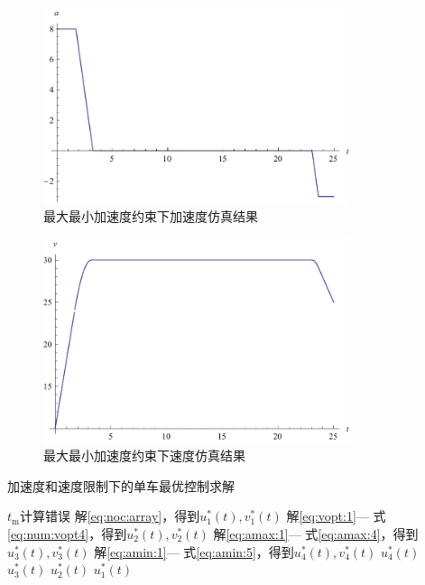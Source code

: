 \begin{figure}[htbp]
\centering
\includegraphics[width=9cm]{figures/uopt/ma.pdf}
\caption{最大最小加速度约束下加速度仿真结果}
\label{fig:amin:ma}
\end{figure}
\begin{figure}[htbp]
\centering
\includegraphics[width=9cm]{figures/uopt/mv.pdf}
\caption{最大最小加速度约束下速度仿真结果}
\label{fig:amin:mv}
\end{figure}

\begin{algorithm}
\small
\caption{加速度和速度限制下的单车最优控制求解}
\label{alg:asin}
\begin{algorithmic}
  \Statex
      \State $t_\mathrm{m}$计算错误
      \State \Return
    \EndIf
    \State 解\eqref{eq:noc:array}，得到$u_1^*(t),v^*_1(t)$
      \State 解\eqref{eq:vopt:1}--- 式\eqref{eq:num:vopt4}，得到$u_2^*(t),v^*_2(t)$
        \State 解\eqref{eq:amax:1}--- 式\eqref{eq:amax:4}，得到$u_3^*(t),v^*_3(t)$
          \State 解\eqref{eq:amin:1}--- 式\eqref{eq:amin:5}，得到$u_4^*(t),v^*_4(t)$
          \State \Return $u_4^*(t)$
        \Else
          \State \Return $u_3^*(t)$
        \EndIf
      \Else
        \State \Return $u_2^*(t)$
      \EndIf
    \Else
      \State \Return $u_1^*(t)$
    \EndIf
  \EndFunction
\end{algorithmic}
\end{algorithm}

